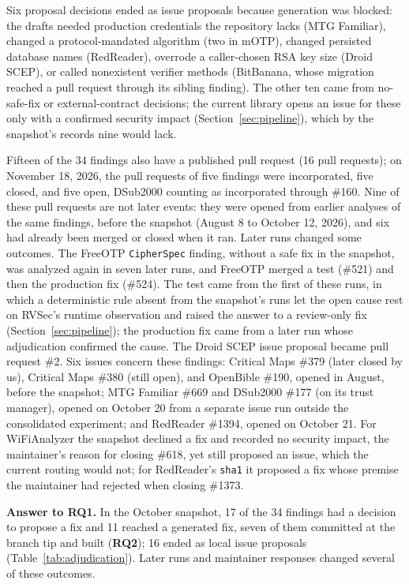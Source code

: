\documentclass[conference]{IEEEtran}
\newcommand{\researchq}[1]{\textbf{RQ#1}}
\begin{document}
Six proposal decisions ended as issue proposals because generation was
blocked: the drafts needed production credentials the repository lacks (MTG
Familiar), changed a protocol-mandated algorithm (two in mOTP), changed
persisted database names (RedReader), overrode a caller-chosen RSA key size
(Droid SCEP), or called nonexistent verifier methods (BitBanana, whose
migration reached a pull request through its sibling finding). The other ten came from
no-safe-fix or external-contract decisions; the current library opens an
issue for these only with a confirmed security impact
(Section~\ref{sec:pipeline}), which by the snapshot's records nine would lack.

Fifteen of the 34 findings also have a published pull request (16 pull
requests); on November 18, 2026, the pull requests of
five findings were incorporated, five closed, and five open, DSub2000 counting
as incorporated through \#160. Nine of these pull requests are not later
events: they were opened from earlier analyses of the same findings, before the
snapshot (August 8 to October 12, 2026), and six had already been merged or
closed when it ran. Later runs changed some outcomes. The FreeOTP
\texttt{CipherSpec} finding, without a safe fix in the snapshot, was analyzed
again in seven later runs, and FreeOTP merged a test (\#521) and then the
production fix (\#524). The test came from the first of these runs, in which a deterministic rule
absent from the snapshot's runs let the open cause rest on RVSec's runtime
observation and raised the answer to a review-only fix
(Section~\ref{sec:pipeline}); the production fix came from a later run whose
adjudication confirmed the cause. The Droid SCEP issue proposal became pull request \#2. Six issues
concern these findings: Critical Maps \#379 (later closed by us), Critical Maps \#380
(still open), and OpenBible \#190, opened in August, before the snapshot; MTG
Familiar \#669 and DSub2000 \#177 (on its trust manager), opened on October 20
from a separate issue run outside the consolidated experiment; and RedReader
\#1394, opened on October 21.
For WiFiAnalyzer the snapshot declined a fix and recorded no security impact,
the maintainer's reason for closing \#618, yet still proposed an issue, which
the current routing would not; for RedReader's \texttt{sha1} it proposed a fix
whose premise the maintainer had rejected when closing \#1373.

\textbf{Answer to \researchq{1}.} In the October snapshot, 17 of the 34
findings had a decision to propose a fix and 11 reached a generated fix, seven
of them committed at the branch tip and built (\researchq{2}); 16 ended as
local issue proposals (Table~\ref{tab:adjudication}). Later runs and
maintainer responses changed several of these outcomes.
\end{document}
